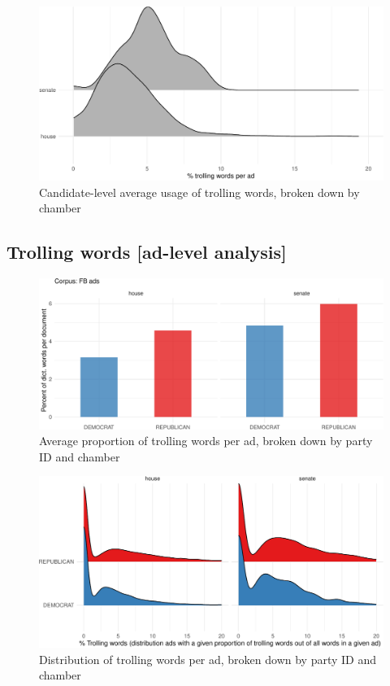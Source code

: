 \documentclass[
  12pt,
]{article}
\begin{document}
\begin{figure}
\centering
\includegraphics{figsFB/unnamed-chunk-14-1.pdf}
\caption{\label{fig:unnamed-chunk-14}Candidate-level average usage of trolling words, broken down by chamber}
\end{figure}

\pagebreak
\clearpage

\hypertarget{trolling-words-ad-level-analysis}{%
\subsection{Trolling words {[}ad-level analysis{]}}\label{trolling-words-ad-level-analysis}}

\begin{figure}
\centering
\includegraphics{figsFB/unnamed-chunk-15-1.pdf}
\caption{\label{fig:unnamed-chunk-15}Average proportion of trolling words per ad, broken down by party ID and chamber}
\end{figure}

\begin{figure}
\centering
\includegraphics{figsFB/unnamed-chunk-16-1.pdf}
\caption{\label{fig:unnamed-chunk-16}Distribution of trolling words per ad, broken down by party ID and chamber}
\end{figure}
\end{document}
